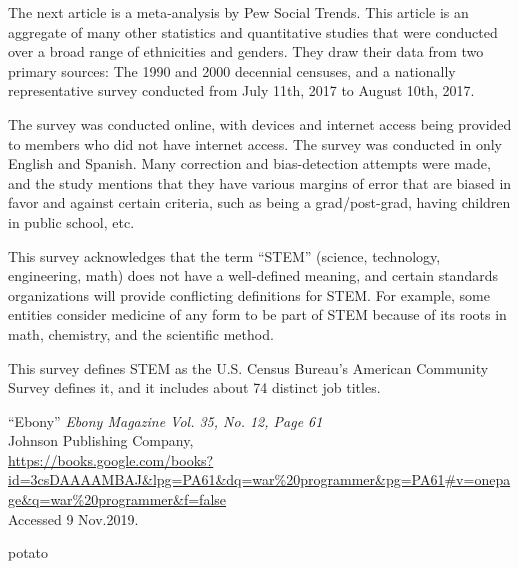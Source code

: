 \documentclass[a4paper,12pt]{article}
\begin{document}
The next article\cite{pew} is a meta-analysis %
by Pew Social Trends. This article is an aggregate of many other statistics and quantitative studies that were conducted over a broad range of ethnicities and genders. They draw their data from two primary sources: The 1990 and 2000 decennial censuses, and a nationally representative %
survey conducted from July 11th, 2017 to August 10th, 2017. 

	The survey was conducted online, with devices and internet access being provided to members who did not have internet access. The survey was conducted in only English and Spanish. Many correction and bias-detection attempts were made, and the study mentions that they have various margins of error that are biased in favor and against certain criteria, such as being a grad/post-grad, having children in public school, etc.

	This survey acknowledges that the term ``STEM'' (science, technology, engineering, math) does not have a well-defined meaning, and certain standards organizations will provide conflicting definitions for STEM. For example, some entities consider medicine of any form to be part of STEM because of its roots in math, chemistry, and the scientific method.

	This survey %
defines STEM as the  U.S. Census Bureau’s American Community Survey defines it, and it includes about 74 distinct job titles.


\newpage
\singlespacing

\begin{thebibliography}{9}

``Ebony'' \textit{Ebony Magazine Vol. 35, No. 12, Page 61}\\
Johnson Publishing Company, \\
\url{https://books.google.com/books?id=3csDAAAAMBAJ&lpg=PA61&dq=war%20programmer&pg=PA61#v=onepage&q=war%20programmer&f=false}  \\
Accessed 9 Nov.2019.

potato

\end{thebibliography}

\newpage

\end{document}
